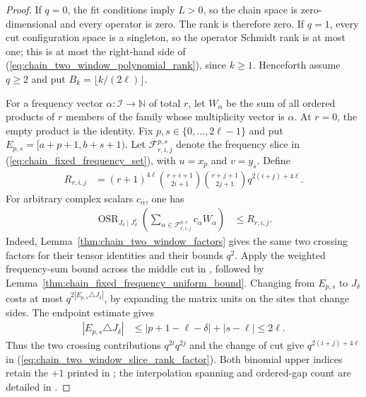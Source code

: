 \begin{proof}\leanok
    If $q=0$, the fit conditions imply $L>0$, so the chain space is
    zero-dimensional and every operator is zero. The rank is therefore zero.
    If $q=1$, every cut configuration space is a singleton, so the operator
    Schmidt rank is at most one; this is at most the right-hand side of
    (\ref{eq:chain_two_window_polynomial_rank}), since $k\ge1$.
    Henceforth assume $q\ge2$ and put $B_k=\lfloor k/(2\ell)\rfloor$.

    For a frequency vector $\alpha:\mathcal I\to\mathbb N$ of total $r$,
    let $W_\alpha$ be the sum of all ordered products of $r$ members of
    the family whose multiplicity vector is $\alpha$.
    At $r=0$, the empty product is the identity.
    Fix $p,s\in\{0,\ldots,2\ell-1\}$ and put
    $E_{p,s}=[a+p+1,b+s+1)$.
    Let $\mathcal F^{p,s}_{r,i,j}$ denote the frequency slice in
    (\ref{eq:chain_fixed_frequency_set}), with $u=x_p$ and $v=y_s$.
    Define
    \begin{align}
        R_{r,i,j}
         & =(r+1)^{4\ell}
        \binom{r+i+1}{2i+1}\binom{r+j+1}{2j+1}
        q^{2(i+j)+4\ell}.
        \label{eq:chain_two_window_slice_rank_factor}
    \end{align}
    For arbitrary complex scalars $c_\alpha$, one has
    \begin{align}
        \operatorname{OSR}_{J_\delta\mid J_\delta^c}\!\left(
        \sum_{\alpha\in\mathcal F^{p,s}_{r,i,j}}c_\alpha W_\alpha\right)
         & \le R_{r,i,j}.
        \label{eq:chain_two_window_weighted_slice_rank}
    \end{align}
    Indeed, Lemma~\ref{thm:chain_two_window_factors} gives the same two
    crossing factors for their tensor identities and their bounds $q^2$.
    Apply the weighted frequency-sum bound across the middle cut in
    \cite{QICLean2026Blueprint}, followed by
    Lemma~\ref{thm:chain_fixed_frequency_uniform_bound}.
    Changing from $E_{p,s}$ to $J_\delta$ costs at most
    $q^{2|E_{p,s}\triangle J_\delta|}$, by expanding the matrix units on
    the sites that change sides. The endpoint estimate gives
    \begin{align}
        |E_{p,s}\triangle J_\delta|
         & \le |p+1-\ell-\delta|+|s-\ell|\le2\ell.
        \label{eq:chain_two_window_polynomial_cut_change}
    \end{align}
    Thus the two crossing contributions $q^{2i}q^{2j}$ and the change of
    cut give $q^{2(i+j)+4\ell}$ in
    (\ref{eq:chain_two_window_slice_rank_factor}).
    Both binomial upper indices retain the $+1$ printed in
    \cite[proof of Proposition~5.7]{Arad2016RigorousRG}; the interpolation
    spanning and ordered-gap count are detailed in
    \cite{gap:aklv13_interpolation_and_word_count}.


\end{proof}
